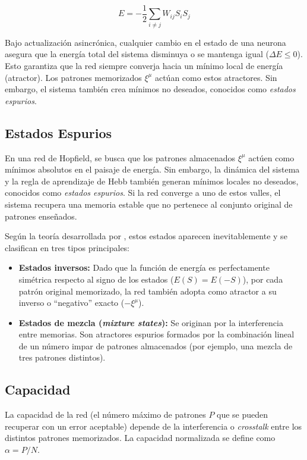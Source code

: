 \begin{equation}
	E = -\frac{1}{2} \sum_{i \neq j} W_{ij} S_i S_j
	\label{eq:energia}
\end{equation}

Bajo actualización asincrónica, cualquier cambio en el estado de una neurona asegura que la energía total del sistema disminuya o se mantenga igual ($\Delta E \leq 0$). Esto garantiza que la red siempre converja hacia un mínimo local de energía (atractor). Los patrones memorizados $\xi^\mu$ actúan como estos atractores. Sin embargo, el sistema también crea mínimos no deseados, conocidos como \textit{estados espurios}.

\subsection{Estados Espurios}
\label{subsec:espurios}

En una red de Hopfield, se busca que los patrones almacenados $\xi^\mu$ actúen como mínimos absolutos en el paisaje de energía. Sin embargo, la dinámica del sistema y la regla de aprendizaje de Hebb también generan mínimos locales no deseados, conocidos como \textit{estados espurios}. Si la red converge a uno de estos valles, el sistema recupera una memoria estable que no pertenece al conjunto original de patrones enseñados.

Según la teoría desarrollada por \cite{hertz1991}, estos estados aparecen inevitablemente y se clasifican en tres tipos principales:
\begin{itemize}
	\item \textbf{Estados inversos:} Dado que la función de energía es perfectamente simétrica respecto al signo de los estados ($E(S) = E(-S)$), por cada patrón original memorizado, la red también adopta como atractor a su inverso o ``negativo'' exacto ($-\xi^\mu$).
	\item \textbf{Estados de mezcla (\textit{mixture states}):} Se originan por la interferencia entre memorias. Son atractores espurios formados por la combinación lineal de un número impar de patrones almacenados (por ejemplo, una mezcla de tres patrones distintos).

\end{itemize}

\subsection{Capacidad}
\label{subsec:capacidad}
La capacidad de la red (el número máximo de patrones $P$ que se pueden recuperar con un error aceptable) depende de la interferencia o \textit{crosstalk} entre los distintos patrones memorizados. La capacidad normalizada se define como $\alpha = P / N$. 

